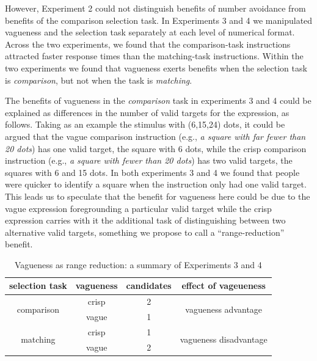 \documentclass[%
man,		%
floatsintext,%
apacite%
]{apa6}
\begin{document}
However, Experiment 2 could not distinguish benefits of number avoidance from benefits of the comparison selection task. In Experiments 3 and 4 we manipulated vagueness and the selection task separately at each level of numerical format. Across the two experiments, we found that the comparison-task instructions attracted faster response times than the matching-task instructions. Within the two experiments we found that vagueness exerts benefits when the selection task is \emph{comparison}, but not when the task is \emph{matching}.

The benefits of vagueness in the \emph{comparison} task in experiments 3 and 4 could be explained as differences in the number of valid targets for the expression, as follows. Taking as an example the stimulus with (6,15,24) dots, it could be argued that the vague comparison instruction (e.g., \emph{a square with far fewer than 20 dots}) has one valid target, the square with 6 dots, while the crisp comparison instruction (e.g., \emph{a square with fewer than 20 dots}) has two valid targets, the squares with 6 and 15 dots. In both experiments 3 and 4 we found that people were quicker to identify a square when the instruction only had one valid target. This leads us to speculate that the benefit for vagueness here could be due to the vague expression foregrounding a particular valid target while the crisp expression carries with it the additional task of distinguishing between two alternative valid targets, something we propose to call a ``range-reduction'' benefit.

\begin{table}[htbp]
\caption{Vagueness as range reduction: a summary of Experiments 3 and 4}
\label{Vagueness as range reduction}
\centering
\begin{tabular}{cccc}
selection task 				& vagueness		& candidates	& effect of vageueness	\\
\toprule
\multirow{ 2}{*}{comparison} 	& crisp 			& 2			& \multirow{ 2}{*}{vagueness advantage}  		\\
\cline{2-3}
  						& vague			& 1			&                                               				\\
\midrule
\multirow{ 2}{*}{matching} 		& crisp 			& 1 			&\multirow{ 2}{*}{vagueness disadvantage}	\\
\cline{2-3}
 						& vague			& 2			&								 	\\
\bottomrule
\end{tabular}
\end{table}
\end{document}
